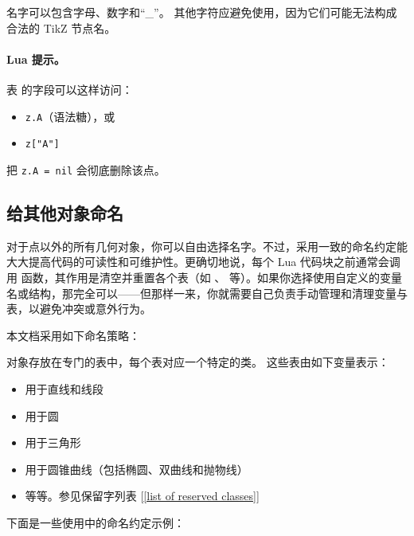 名字可以包含字母、数字和“\_”。
其他字符应避免使用，因为它们可能无法构成合法的 TikZ
节点名。

\paragraph{Lua 提示。}

表  的字段可以这样访问：

\begin{itemize}
  \item \verb|z.A|（语法糖），或
  \item \verb|z["A"]|
\end{itemize}

把 \verb|z.A = nil| 会彻底删除该点。


\subsection{给其他对象命名}
对于点以外的所有几何对象，你可以自由选择名字。不过，采用一致的命名约定能大大提高代码的可读性和可维护性。更确切地说，每个 Lua 代码块之前通常会调用  函数，其作用是清空并重置各个表（如 、 等）。如果你选择使用自定义的变量名或结构，那完全可以——但那样一来，你就需要自己负责手动管理和清理变量与表，以避免冲突或意外行为。

本文档采用如下命名策略：


对象存放在专门的表中，每个表对应一个特定的类。
这些表由如下变量表示：
\begin{itemize}

\item {} 用于直线和线段
\item {} 用于圆
\item {} 用于三角形
\item {} 用于圆锥曲线（包括椭圆、双曲线和抛物线）

\item 等等。参见保留字列表 [\ref{list of reserved classes}]
\end{itemize}

下面是一些使用中的命名约定示例：

